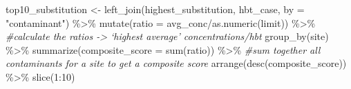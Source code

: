 \documentclass[12pt, twoside]{amherstthesis}
\newenvironment{Shaded}{\begin{snugshade}}{\end{snugshade}}
\newcommand{\AttributeTok}[1]{\textcolor[rgb]{0.77,0.63,0.00}{#1}}
\newcommand{\CommentTok}[1]{\textcolor[rgb]{0.56,0.35,0.01}{\textit{#1}}}
\newcommand{\DecValTok}[1]{\textcolor[rgb]{0.00,0.00,0.81}{#1}}
\newcommand{\FunctionTok}[1]{\textcolor[rgb]{0.00,0.00,0.00}{#1}}
\newcommand{\NormalTok}[1]{#1}
\newcommand{\OtherTok}[1]{\textcolor[rgb]{0.56,0.35,0.01}{#1}}
\newcommand{\SpecialCharTok}[1]{\textcolor[rgb]{0.00,0.00,0.00}{#1}}
\newcommand{\StringTok}[1]{\textcolor[rgb]{0.31,0.60,0.02}{#1}}
\begin{document}
\begin{Shaded}
\begin{Highlighting}[]
\NormalTok{top10\_substitution }\OtherTok{\textless{}{-}} \FunctionTok{left\_join}\NormalTok{(highest\_substitution, hbt\_case, }\AttributeTok{by =} \StringTok{"contaminant"}\NormalTok{) }\SpecialCharTok{\%\textgreater{}\%}
  \FunctionTok{mutate}\NormalTok{(}\AttributeTok{ratio =}\NormalTok{ avg\_conc}\SpecialCharTok{/}\FunctionTok{as.numeric}\NormalTok{(limit)) }\SpecialCharTok{\%\textgreater{}\%} \CommentTok{\#calculate the ratios {-}\textgreater{} ‘highest average’ concentrations/hbt}
  \FunctionTok{group\_by}\NormalTok{(site) }\SpecialCharTok{\%\textgreater{}\%}
  \FunctionTok{summarize}\NormalTok{(}\AttributeTok{composite\_score =} \FunctionTok{sum}\NormalTok{(ratio)) }\SpecialCharTok{\%\textgreater{}\%} \CommentTok{\#sum together all contaminants for a site to get a composite score}
  \FunctionTok{arrange}\NormalTok{(}\FunctionTok{desc}\NormalTok{(composite\_score)) }\SpecialCharTok{\%\textgreater{}\%}
  \FunctionTok{slice}\NormalTok{(}\DecValTok{1}\SpecialCharTok{:}\DecValTok{10}\NormalTok{)}
\end{Highlighting}
\end{Shaded}
\end{document}
